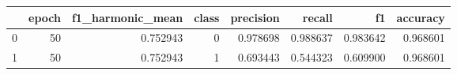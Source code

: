 \begin{tabular}{lrrrrrrr}
\toprule
 & epoch & f1_harmonic_mean & class & precision & recall & f1 & accuracy \\
\midrule
0 & 50 & 0.752943 & 0 & 0.978698 & 0.988637 & 0.983642 & 0.968601 \\
1 & 50 & 0.752943 & 1 & 0.693443 & 0.544323 & 0.609900 & 0.968601 \\
\bottomrule
\end{tabular}
